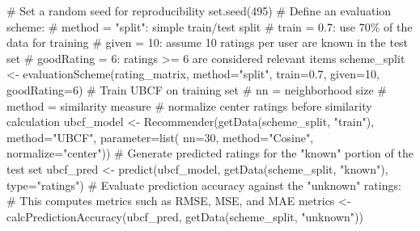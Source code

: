 \documentclass[
  12pt]{article}
\newenvironment{Shaded}{\begin{snugshade}}{\end{snugshade}}
\newcommand{\AttributeTok}[1]{\textcolor[rgb]{0.40,0.45,0.13}{#1}}
\newcommand{\CommentTok}[1]{\textcolor[rgb]{0.37,0.37,0.37}{#1}}
\newcommand{\DecValTok}[1]{\textcolor[rgb]{0.68,0.00,0.00}{#1}}
\newcommand{\FloatTok}[1]{\textcolor[rgb]{0.68,0.00,0.00}{#1}}
\newcommand{\FunctionTok}[1]{\textcolor[rgb]{0.28,0.35,0.67}{#1}}
\newcommand{\NormalTok}[1]{\textcolor[rgb]{0.00,0.23,0.31}{#1}}
\newcommand{\OtherTok}[1]{\textcolor[rgb]{0.00,0.23,0.31}{#1}}
\newcommand{\StringTok}[1]{\textcolor[rgb]{0.13,0.47,0.30}{#1}}
\begin{document}
\begin{Shaded}
\begin{Highlighting}[]
\CommentTok{\# Set a random seed for reproducibility}
\FunctionTok{set.seed}\NormalTok{(}\DecValTok{495}\NormalTok{)}
\CommentTok{\# Define an evaluation scheme:}
\CommentTok{\# method = "split": simple train/test split}
\CommentTok{\# train = 0.7: use 70\% of the data for training}
\CommentTok{\# given = 10: assume 10 ratings per user are known in the test set}
\CommentTok{\# goodRating = 6: ratings \textgreater{}= 6 are considered relevant items}
\NormalTok{scheme\_split }\OtherTok{\textless{}{-}} \FunctionTok{evaluationScheme}\NormalTok{(rating\_matrix, }
                                 \AttributeTok{method=}\StringTok{"split"}\NormalTok{, }
                                 \AttributeTok{train=}\FloatTok{0.7}\NormalTok{, }
                                 \AttributeTok{given=}\DecValTok{10}\NormalTok{, }
                                 \AttributeTok{goodRating=}\DecValTok{6}\NormalTok{)}
\CommentTok{\# Train UBCF on training set}
\CommentTok{\# nn = neighborhood size }
\CommentTok{\# method = similarity measure}
\CommentTok{\# normalize center ratings before similarity calculation}
\NormalTok{ubcf\_model }\OtherTok{\textless{}{-}} \FunctionTok{Recommender}\NormalTok{(}\FunctionTok{getData}\NormalTok{(scheme\_split, }\StringTok{"train"}\NormalTok{), }
                          \AttributeTok{method=}\StringTok{"UBCF"}\NormalTok{,}
                          \AttributeTok{parameter=}\FunctionTok{list}\NormalTok{(}
                            \AttributeTok{nn=}\DecValTok{30}\NormalTok{, }\AttributeTok{method=}\StringTok{"Cosine"}\NormalTok{, }\AttributeTok{normalize=}\StringTok{"center"}\NormalTok{))}
\CommentTok{\# Generate predicted ratings for the "known" portion of the test set}
\NormalTok{ubcf\_pred }\OtherTok{\textless{}{-}} \FunctionTok{predict}\NormalTok{(ubcf\_model, }\FunctionTok{getData}\NormalTok{(scheme\_split, }\StringTok{"known"}\NormalTok{), }
                     \AttributeTok{type=}\StringTok{"ratings"}\NormalTok{)}
\CommentTok{\# Evaluate prediction accuracy against the "unknown" ratings:}
\CommentTok{\# This computes metrics such as RMSE, MSE, and MAE}
\NormalTok{metrics }\OtherTok{\textless{}{-}} \FunctionTok{calcPredictionAccuracy}\NormalTok{(ubcf\_pred, }\FunctionTok{getData}\NormalTok{(scheme\_split, }
                                                     \StringTok{"unknown"}\NormalTok{))}
\end{Highlighting}
\end{Shaded}
\end{document}
